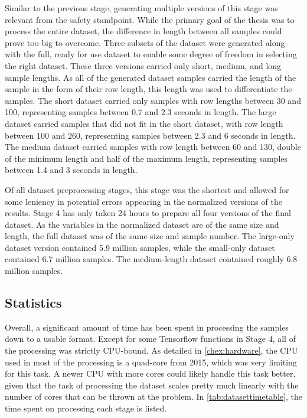 Similar to the previous stage, generating multiple versions of this stage was relevant from the safety standpoint.
While the primary goal of the thesis was to process the entire dataset, the difference in length between all samples could prove too big to overcome.
Three subsets of the dataset were generated along with the full, ready for use dataset to enable some degree of freedom in selecting the right dataset.
These three versions carried only short, medium, and long sample lengths.
As all of the generated dataset samples carried the length of the sample in the form of their row length, this length was used to differentiate the samples.
The short dataset carried only samples with row lengths between 30 and 100, representing samples between 0.7 and 2.3 seconds in length.
The large dataset carried samples that did not fit in the short dataset, with row length between 100 and 260, representing samples between 2.3 and 6 seconds in length.
The medium dataset carried samples with row length between 60 and 130, double of the minimum length and half of the maximum length, representing samples between 1.4 and 3 seconds in length.

Of all dataset preprocessing stages, this stage was the shortest and allowed for some leniency in potential errors appearing in the normalized versions of the results.
Stage 4 has only taken 24 hours to prepare all four versions of the final dataset.
As the variables in the normalized dataset are of the same size and length, the full dataset was of the same size and sample number.
The large-only dataset version contained 5.9 million samples, while the small-only dataset contained 6.7 million samples.
The medium-length dataset contained roughly 6.8 million samples.


\subsection{Statistics}

Overall, a significant amount of time has been spent in processing the samples down to a usable format.
Except for some Tensorflow functions in Stage 4, all of the processing was strictly CPU-bound.
As detailed in \autoref{chex:hardware}, the CPU used in most of the processing is a quad-core from 2015, which was very limiting for this task.
A newer CPU with more cores could likely handle this task better, given that the task of processing the dataset scales pretty much linearly with the number of cores that can be thrown at the problem.
In \cref{tab:datasettimetable}, the time spent on processing each stage is listed.


